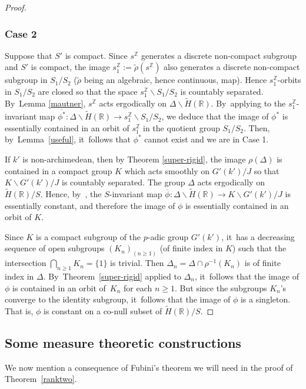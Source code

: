 \documentclass[JEP,XML,SOM,Unicode,published]{cedram}
\theoremstyle{definition}
\newcommand{\field}[1]{\mathbb{#1}}
\newcommand{\R}{\field{R}}
\newcommand{\Z}{\field{Z}}
\let\bs\backslash
\begin{document}
\begin{proof}
\subsubsection*{Case 2}
Suppose that $S'$ is compact. Since $s^{\Z}$ generates a discrete
non-compact subgroup and $S'$ is compact, the image $s_1^{\Z}:= \tilde
\rho (s^{\Z})$ also generates a discrete non-compact subgroup in
$S_1/S_2$ ($\tilde \rho $ being an algebraic, hence continuous, map).
Hence $s_1^{\Z}$-orbits in $S_1/S_2$ are closed so that the space
$s_1^{\Z}\bs S_1/S_2$ is countably separated. By~Lemma \ref{mautner},
$s^{\Z}$ acts ergodically on $\Delta \bs \tilde H(\R)$. By~applying
\cite[Prop.\,(2.1.11)]{Z} to the $s_1^{\Z}$-invariant map
$\overline{\phi ^*}: \Delta \bs \tilde H(\R)\to s_1^{\Z}\bs S_1/S_2$,
we deduce that the image of $\phi ^*$ is essentially contained in an
orbit of $s_1^{\Z}$ in the quotient group $S_1/S_2$. Then, by~Lemma~\ref{useful}, it~follows that $\phi ^*$ cannot exist and we are in Case 1.

If $k'$ is non-archimedean, then by Theorem \ref{super-rigid}, the
image $\rho (\Delta)$ is contained in a compact group $K$ which acts
smoothly on $G'(k')/J$ so that $K\bs G'(k')/J$ is countably
separated. The group $\Delta $ acts ergodically on $\tilde H(\R)/S$.
Hence, by~\cite[Prop.\,(2.1.11)]{Z}, the $S$-invariant map
$\overline{\phi} :\Delta \bs \tilde {H}(\R) \to K\bs G'(k')/J$ is
essentially constant, and therefore the image of $\phi$ is essentially
contained in an orbit of $K$.

Since $K$ is a compact subgroup of the $p$-adic group $G'(k')$, it~has
a decreasing sequence of open subgroups $(K_n)_{(n\geq 1)}$ (of
finite index in $K$) such that the intersection $\bigcap_{n\geq 1}
K_n=\{1\}$ is trivial. Then $\Delta_n=\Delta \cap \rho ^{-1}(K_n)$
is of finite index in $\Delta$. By~Theorem~\ref{super-rigid} applied to
$\Delta_n$, it~follows that the image of $\phi $ is contained in an
orbit of~$K_n$ for each $n\geq 1$. But since the subgroups $K_n$'s
converge to the identity subgroup, it~follows that the image of $\phi
$ is a singleton. That is, $\phi $ is constant on a co-null subset of $\tilde{H}(\R)/S$.
\end{proof}

\subsection{Some measure theoretic constructions}

We now mention a consequence of Fubini's theorem we will need in the proof of Theorem~\ref{ranktwo}.
\end{document}
